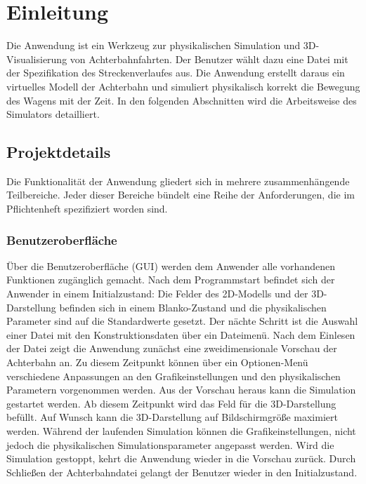 
\chapter{Einleitung}

Die Anwendung ist ein Werkzeug zur physikalischen Simulation und 3D-Visualisierung von Achterbahnfahrten.
Der Benutzer wählt dazu eine Datei mit der Spezifikation des Streckenverlaufes aus. Die Anwendung erstellt 
daraus ein virtuelles Modell der Achterbahn und simuliert physikalisch korrekt die Bewegung des Wagens mit
der Zeit. In den folgenden Abschnitten wird die Arbeitsweise des Simulators detailliert.

\section{Projektdetails}
Die Funktionalität der Anwendung gliedert sich in mehrere zusammenhängende Teilbereiche. Jeder dieser
Bereiche bündelt eine Reihe der Anforderungen, die im Pflichtenheft spezifiziert worden sind.

\subsection{Benutzeroberfläche}
Über die Benutzeroberfläche (GUI) werden dem Anwender alle vorhandenen Funktionen zugänglich gemacht.
Nach dem Programmstart befindet sich der Anwender in einem Initialzustand: Die Felder des 2D-Modells
und der 3D-Darstellung befinden sich in einem Blanko-Zustand und die physikalischen Parameter sind
auf die Standardwerte gesetzt. Der nächte Schritt ist die Auswahl einer Datei mit den Konstruktionsdaten
über ein Dateimenü. Nach dem Einlesen der Datei zeigt die Anwendung zunächst eine zweidimensionale 
Vorschau der Achterbahn an. Zu diesem Zeitpunkt können über ein Optionen-Menü verschiedene Anpassungen 
an den Grafikeinstellungen und den physikalischen Parametern vorgenommen werden. 
Aus der Vorschau heraus kann die Simulation gestartet werden. Ab diesem Zeitpunkt wird das Feld für 
die 3D-Darstellung befüllt. Auf Wunsch kann die 3D-Darstellung auf Bildschirmgröße
maximiert werden. Während der laufenden Simulation können die Grafikeinstellungen, nicht jedoch
die physikalischen Simulationsparameter angepasst werden. Wird die Simulation gestoppt, kehrt die Anwendung
wieder in die Vorschau zurück. Durch Schließen der Achterbahndatei gelangt der Benutzer wieder in den 
Initialzustand.

